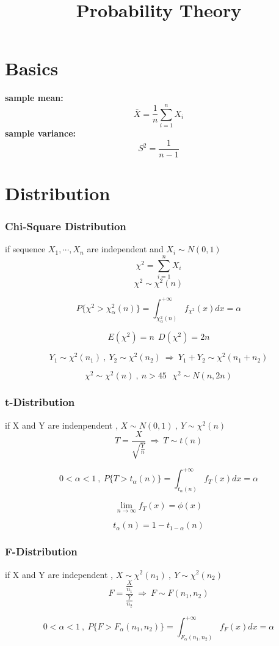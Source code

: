 \documentclass{ctexart}
\date{}
\title{Probability Theory}
\begin{document}
\maketitle
\tableofcontents
\newpage
\section{Basics}
\textbf{sample mean:}
\[\bar{X}=\frac{1}{n}\sum_{i=1}^{n}X_i\]
\textbf{sample variance:}
\[S^2=\frac{1}{n-1}\]

\section{Distribution}
\subsubsection{Chi-Square Distribution}
if sequence \(X_1,\cdots ,X_n\) are independent and \(X_i\sim N(0,1)\)
\[\chi^2 =\sum_{i=1}^{n}X_i\]
\[\chi^2 \sim \chi^2(n)\]

\[P\{\chi^2>\chi^2_{\alpha}(n)\}=\int_{\chi^2_{\alpha}(n)}^{+\infty}f_{\chi^2}(x)dx=\alpha\]

\[E(\chi^2)=n\ \ D(\chi^2)=2n\]

\[Y_1\sim \chi^2(n_1)\ , \ Y_2\sim \chi^2(n_2) \ \Rightarrow \ Y_1+Y_2\sim \chi^2(n_1+n_2)\]

\[\chi^2\sim \chi^2(n) \ , \ n>45 \ \ \ \chi^2 \sim N(n,2n)\]

\subsubsection{t-Distribution}
if X and Y are indenpendent , \(X\sim N(0,1)\ , \ Y\sim \chi^2(n)\)
\[T=\frac{X}{\sqrt{\frac{Y}{n}}} \ \Rightarrow \ T\sim t(n)\]

\[0<\alpha<1\ , \ P\{T>t_\alpha(n)\}=\int_{t_\alpha(n)}^{+\infty}f_T(x)dx=\alpha\]

\[\lim_{n\to \infty}f_T(x)=\phi(x)\]

\[t_\alpha(n)=1-t_{1-\alpha}(n)\]

\subsubsection{F-Distribution}
if X and Y are independent , \(X\sim \chi^2(n_1)\ , \ Y\sim \chi^2(n_2)\)
\[F=\frac{\frac{X}{n_1}}{\frac{Y}{n_2}} \ \Rightarrow \ F\sim F(n_1,n_2)\]

\[0<\alpha <1 \ , \ P\{F>F_\alpha(n_1,n_2)\}=\int_{F_\alpha(n_1,n_2)}^{+\infty}f_F(x)dx=\alpha\]
\end{document}
